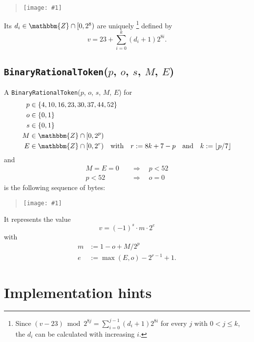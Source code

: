 \documentclass{dbor-article}
\newcommand{\SetOfIntegers}{\mathbbm{Z}}
\newcommand{\DborSyntaxIdent}[1]{\texttt{#1}}
\newcommand{\IncludeImageInPlace}[1]{%
        \begin{quotation}%
            \texttt{[image: \#1]}%
        \end{quotation}%
    }
\begin{document}
    \IncludeImageInPlace{IntegerTokenB}

    Its $d_i \in \SetOfIntegers \cap [0, 2^8)$ are uniquely%
    \footnote{%
        Since $(v - 23) \bmod 2^{8 j} = \sum_{i = 0}^{j - 1} (d_i + 1) 2^{8 i}$ for every $j$ with $0 < j \le k$,
        the $d_i$ can be calculated with increasing $i$.
    }
    defined by 
    \begin{equation}
        v = 23 + \sum_{i = 0}^k (d_i + 1) 2^{8 i}.
    \end{equation}

    
    \subsection{\DborSyntaxIdent{BinaryRationalToken}($p$, $o$, $s$, $M$, $E$)}
    \hypertarget{sec:def:BinaryRationalToken}{}

    A \DborSyntaxIdent{BinaryRationalToken}($p$, $o$, $s$, $M$, $E$) for
    \begin{align*}
        p & \in \{4, 10, 16, 23, 30, 37, 44, 52\} \\
        o & \in \{0, 1\} \\
        s & \in \{0, 1\} \\
        M & \in \SetOfIntegers \cap [0, 2^p) \\
        E & \in \SetOfIntegers \cap [0, 2^r)
            \quad\text{with}\quad r := 8 k + 7 - p
            \quad\text{and}\quad k := \lfloor p / 7 \rfloor
    \end{align*}%
    and
    \begin{align*}
        M = E = 0 \quad & \Rightarrow \quad p < 52 \\
        p < 52 \quad & \Rightarrow \quad o = 0
    \end{align*}%
    is the following sequence of bytes:

    \IncludeImageInPlace{BinaryRationalToken}

    It represents the value
    \begin{equation}
        v = (-1)^s \cdot m \cdot 2^e
    \end{equation}
    with
    \begin{align*}
        m & := 1 - o + M / 2^p \\
        e & := \max(E, o) - 2^{r-1} + 1.
    \end{align*}

    \section{Implementation hints}
    \label{sec:implementation}
\end{document}
